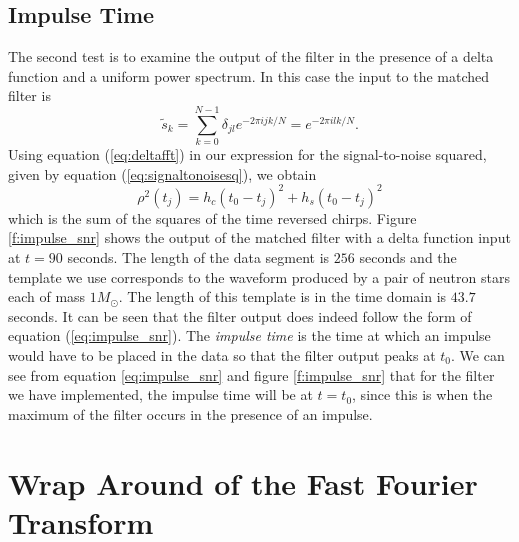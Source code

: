 \subsection{Impulse Time}
\label{ss:impulsetime}

The second test is to examine the output of the filter in the presence of a
delta function and a uniform power spectrum. In this case the input to the
matched filter is
\begin{equation}
\tilde{s}_k = \sum_{k=0}^{N-1} \delta_{jl} e^{-2\pi ijk/N} = e^{-2\pi ilk/N}.
\label{eq:deltafft}
\end{equation}
Using equation (\ref{eq:deltafft}) in our expression for the signal-to-noise
squared, given by equation (\ref{eq:signaltonoisesq}), we obtain
\begin{equation}
\rho^2(t_j) = h_c(t_0 - t_j)^2 + h_s(t_0 - t_j)^2
\label{eq:impulse_snr}
\end{equation}
which is the sum of the squares of the time reversed chirps.  Figure
\ref{f:impulse_snr} shows the output of the matched filter with a delta
function input at $t=90$ seconds. The length of the data segment is $256$
seconds and the template we use corresponds to the waveform produced by a pair
of neutron stars each of mass $1 M_\odot$. The length of this template is in
the time domain is $43.7$ seconds.  It can be seen that the filter output does
indeed follow the form of equation (\ref{eq:impulse_snr}). The \emph{impulse
time} is the time at which an impulse would have to be placed in the data so
that the filter output peaks at $t_0$. We can see from equation
\ref{eq:impulse_snr} and figure \ref{f:impulse_snr} that for the filter we
have implemented, the impulse time will be at $t = t_0$, since this is when
the maximum of the filter occurs in the presence of an impulse.

\section{Wrap Around of the Fast Fourier Transform}
\label{s:wraparound}


